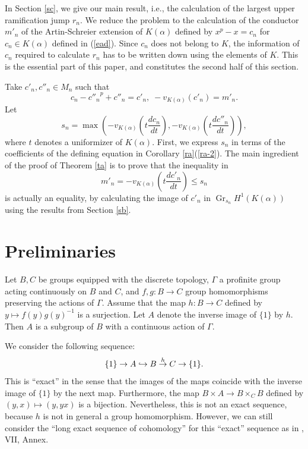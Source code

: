 \documentclass[10pt,a4paper]{amsart}
\numberwithin{equation}{section}
\newcommand{\Gr}{\operatorname{Gr}}
\theoremstyle{plain}
\theoremstyle{definition}
\begin{document}
In Section \ref{sc}, we give our main result, i.e., the calculation of the largest upper ramification jump $r_n$. We reduce the problem to the calculation of the conductor $m'_n$ of the Artin-Schreier extension of $K(\alpha)$ defined by $x^p-x=c_n$ for $c_n\in K(\alpha)$ defined in (\ref{ead}). Since $c_n$ does not belong to $K$, the information of $c_n$ required to calculate $r_n$ has to be written down using the elements of $K$. This is the essential part of this paper, and constitutes the second half of this section.

Take $c'_n,c''_n\in M_n$ such that
\begin{equation}
c_n-{c''_n}^p+c''_n=c'_n,\; -v_{K(\alpha)}(c'_n)=m'_n.
\end{equation}
Let
\begin{equation}
s_n=\max\left(-v_{K(\alpha)}\left(t\frac{dc_n}{dt}\right),-v_{K(\alpha)}\left(t\frac{dc''_n}{dt}\right)\right),
\end{equation}
where $t$ denotes a uniformizer of $K(\alpha)$. First, we express $s_n$ in terms of the coefficients of the defining equation in Corollary \ref{ra}(\ref{ra-2}). The main ingredient of the proof of Theorem \ref{ta} is to prove that the inequality in
\begin{equation}
m'_n=-v_{K(\alpha)}\left(t\frac{dc'_n}{dt}\right)\leq s_n
\end{equation}
is actually an equality, by calculating the image of $c'_n$ in $\Gr_{s_n}H^1(K(\alpha))$ using the results from Section \ref{sb}. 



\section{Preliminaries}\label{sa}

Let $B,C$ be groups equipped with the discrete topology, $\Gamma$ a profinite group acting continuously on $B$ and $C$, and $f,g:B\to C$ group homomorphisms preserving the actions of $\Gamma$. Assume that the map $h:B\to C$ defined by $y\mapsto f(y)g(y)^{-1}$ is a surjection. Let $A$ denote the inverse image of $\{1\}$ by $h$. Then $A$ is a subgroup of $B$ with a continuous action of $\Gamma$.

We consider the following sequence:
\begin{equation}
\{1\}\to A\hookrightarrow B\overset{h}{\to} C\to\{1\}.\\
\end{equation}
This is ``exact'' in the sense that the images of the maps coincide with the inverse image of $\{1\}$ by the next map. Furthermore, the map $B\times A\to B\times_CB$ defined by $(y,x)\mapsto (y,yx)$ is a bijection. Nevertheless, this is not an exact sequence, because $h$ is not in general a group homomorphism. However, we can still consider the ``long exact sequence of cohomology'' for this ``exact'' sequence as in \cite{Se}, VII, Annex.\\
\end{document}
